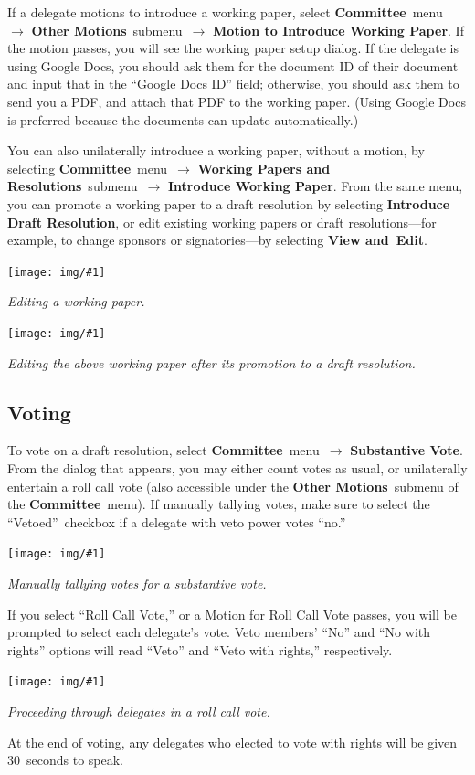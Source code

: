 \documentclass{article}
\newcommand{\navstep}[2]{\navitem{#1}~{#2}~$\rightarrow$}
\newcommand{\navitem}[1]{\textbf{#1}}
\newcommand{\encouragebreak}[1]{\vfil\penalty-#1\vfilneg}
\newcommand{\img}[2]{%
  \begin{center}
    \vspace{6pt}
    \encouragebreak{100}
    \centerline{\texttt{[image: img/\#1]}}
    {\slshape #2}
    \encouragebreak{300}
  \end{center}
}
\begin{document}
If a delegate motions to introduce a working paper, select \navstep{Committee}{menu} \navstep{Other Motions}{submenu} \navitem{Motion to Introduce Working Paper}.
If the motion passes, you will see the working paper setup dialog.
If the delegate is using Google Docs, you should ask them for the document ID of their document and input that in the ``Google Docs ID'' field; otherwise, you should ask them to send you a PDF, and attach that PDF to the working paper.
(Using Google Docs is preferred because the documents can update automatically.)

You can also unilaterally introduce a working paper, without a motion, by selecting \navstep{Committee}{menu} \navstep{Working Papers and Resolutions}{submenu} \navitem{Introduce Working Paper}.
From the same menu, you can promote a working paper to a draft resolution by selecting \navitem{Introduce Draft Resolution}, or edit existing working papers or draft resolutions---for example, to change sponsors or signatories---by selecting \navitem{View and~Edit}.

\img{editing_working_papers}{Editing a working paper.}
\img{editing_draft_resolution}{Editing the above working paper after its promotion to a draft resolution.}

\subsection{Voting}

To vote on a draft resolution, select \navstep{Committee}{menu} \navitem{Substantive Vote}.
From the dialog that appears, you may either count votes as usual, or unilaterally entertain a roll call vote (also accessible under the \navitem{Other Motions}~submenu of the \navitem{Committee}~menu).
If manually tallying votes, make sure to select the ``Vetoed''~checkbox if a delegate with veto power votes ``no.''

\img{substantive_vote_manual}{Manually tallying votes for a substantive vote.}

If you select ``Roll Call Vote,'' or a Motion for Roll Call Vote passes, you will be prompted to select each delegate's vote.
Veto members' ``No'' and ``No with rights'' options will read ``Veto'' and ``Veto with rights,'' respectively.

\img{substantive_vote_roll_call}{Proceeding through delegates in a roll call vote.}

At the end of voting, any delegates who elected to vote with rights will be given 30~seconds to speak.
\end{document}
